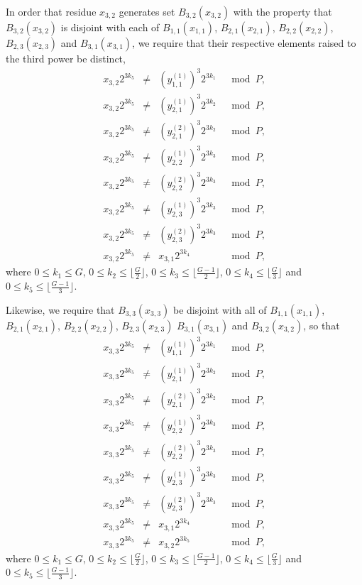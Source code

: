 In order that residue $x_{3,2}$ generates set $B_{3,2}(x_{3,2})$
with the property that $B_{3,2}(x_{3,2})$ is disjoint with each of
$B_{1,1}(x_{1,1})$, $B_{2,1}(x_{2,1})$, $B_{2,2}(x_{2,2})$,
$B_{2,3}(x_{2,3})$ and $B_{3,1}(x_{3,1})$, we require that their
respective elements raised to the third power be distinct,
\begin{equation}\label{eqx32}\begin{array}{cccc}
x_{3,2}2^{3k_5} &\neq& (y_{1,1}^{(1)})^3 2^{3k_1} &\mod P, \\
x_{3,2}2^{3k_5} &\neq& (y_{2,1}^{(1)})^3 2^{3k_2} &\mod P, \\
x_{3,2}2^{3k_5} &\neq& (y_{2,1}^{(2)})^3 2^{3k_2} &\mod P, \\
x_{3,2}2^{3k_5} &\neq& (y_{2,2}^{(1)})^3 2^{3k_3} &\mod P, \\
x_{3,2}2^{3k_5} &\neq& (y_{2,2}^{(2)})^3 2^{3k_3} &\mod P, \\
x_{3,2}2^{3k_5} &\neq& (y_{2,3}^{(1)})^3 2^{3k_3} &\mod P, \\
x_{3,2}2^{3k_5} &\neq& (y_{2,3}^{(2)})^3 2^{3k_3} &\mod P, \\
x_{3,2}2^{3k_5} &\neq& x_{3,1} 2^{3k_4} &\mod P,
\end{array}\end{equation}
where $0 \leq k_1 \leq G$, $0 \leq k_2 \leq \lfloor \frac{G}{2}
\rfloor$, $0 \leq k_3 \leq \lfloor\frac{G-1}{2} \rfloor$, $0 \leq
k_4 \leq \lfloor\frac{G}{3} \rfloor$ and $0 \leq k_5 \leq
\lfloor\frac{G-1}{3} \rfloor$.

Likewise, we require that $B_{3,3}(x_{3,3})$ be disjoint with all
of  $B_{1,1}(x_{1,1})$, $B_{2,1}(x_{2,1})$, $B_{2,2}(x_{2,2})$,
$B_{2,3}(x_{2,3})$ $B_{3,1}(x_{3,1})$ and $B_{3,2}(x_{3,2})$, so
that
\begin{equation}\label{eqx33}\begin{array}{cccc}
x_{3,3}2^{3k_5} &\neq& (y_{1,1}^{(1)})^3 2^{3k_1} &\mod P, \\
x_{3,3}2^{3k_5} &\neq& (y_{2,1}^{(1)})^3 2^{3k_2} &\mod P, \\
x_{3,3}2^{3k_5} &\neq& (y_{2,1}^{(2)})^3 2^{3k_2} &\mod P, \\
x_{3,3}2^{3k_5} &\neq& (y_{2,2}^{(1)})^3 2^{3k_3} &\mod P, \\
x_{3,3}2^{3k_5} &\neq& (y_{2,2}^{(2)})^3 2^{3k_3} &\mod P, \\
x_{3,3}2^{3k_5} &\neq& (y_{2,3}^{(1)})^3 2^{3k_3} &\mod P, \\
x_{3,3}2^{3k_5} &\neq& (y_{2,3}^{(2)})^3 2^{3k_3} &\mod P, \\
x_{3,3}2^{3k_5} &\neq& x_{3,1} 2^{3k_4} &\mod P, \\
x_{3,3}2^{3k_5} &\neq& x_{3,2} 2^{3k_5} &\mod P,
\end{array}\end{equation}
where $0 \leq k_1 \leq G$, $0 \leq k_2 \leq \lfloor \frac{G}{2}
\rfloor$, $0 \leq k_3 \leq \lfloor\frac{G-1}{2} \rfloor$, $0 \leq
k_4 \leq \lfloor\frac{G}{3} \rfloor$ and $0 \leq k_5 \leq
\lfloor\frac{G-1}{3} \rfloor$.

